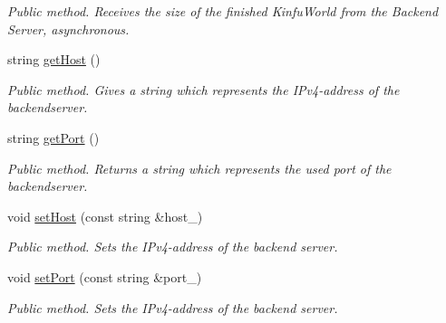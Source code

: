 \begin{DoxyCompactItemize}
\begin{DoxyCompactList}\small\item\em Public method. Receives the size of the finished Kinfu\+World from the Backend Server, asynchronous. \end{DoxyCompactList}\item 
\hypertarget{class_d_d_s_client_a8c0e733323837567d33b0dbdc4472074}{string \hyperlink{class_d_d_s_client_a8c0e733323837567d33b0dbdc4472074}{get\+Host} ()}\label{class_d_d_s_client_a8c0e733323837567d33b0dbdc4472074}

\begin{DoxyCompactList}\small\item\em Public method. Gives a string which represents the I\+Pv4-\/address of the backendserver. \end{DoxyCompactList}\item 
\hypertarget{class_d_d_s_client_a21ad759ad351f9e77b22cec2c7353f57}{string \hyperlink{class_d_d_s_client_a21ad759ad351f9e77b22cec2c7353f57}{get\+Port} ()}\label{class_d_d_s_client_a21ad759ad351f9e77b22cec2c7353f57}

\begin{DoxyCompactList}\small\item\em Public method. Returns a string which represents the used port of the backendserver. \end{DoxyCompactList}\item 
\hypertarget{class_d_d_s_client_aeba51463ac23edc06f7384957d28f2f0}{void \hyperlink{class_d_d_s_client_aeba51463ac23edc06f7384957d28f2f0}{set\+Host} (const string \&host\+\_\+)}\label{class_d_d_s_client_aeba51463ac23edc06f7384957d28f2f0}

\begin{DoxyCompactList}\small\item\em Public method. Sets the I\+Pv4-\/address of the backend server. \end{DoxyCompactList}\item 
\hypertarget{class_d_d_s_client_a86b8c929d70c03ef84f84a32ae2e778e}{void \hyperlink{class_d_d_s_client_a86b8c929d70c03ef84f84a32ae2e778e}{set\+Port} (const string \&port\+\_\+)}\label{class_d_d_s_client_a86b8c929d70c03ef84f84a32ae2e778e}

\begin{DoxyCompactList}\small\item\em Public method. Sets the I\+Pv4-\/address of the backend server. \end{DoxyCompactList}\end{DoxyCompactItemize}


